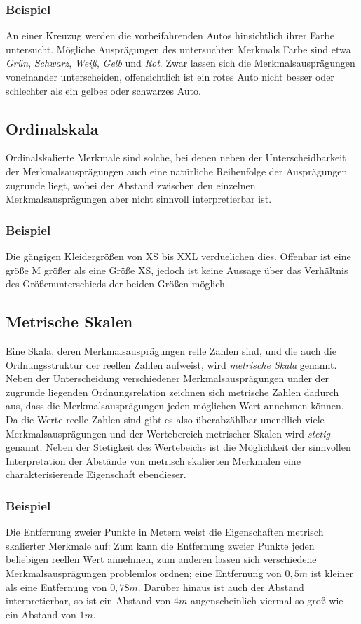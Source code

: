 \documentclass[fontsize=11pt]{scrartcl}
\begin{document}
                \subsubsection{Beispiel}
                    An einer Kreuzug werden die vorbeifahrenden Autos hinsichtlich ihrer Farbe untersucht. Mögliche Ausprägungen des untersuchten Merkmals Farbe sind etwa \emph{Grün}, \emph{Schwarz}, \emph{Weiß}, \emph{Gelb} und \emph{Rot}. Zwar lassen sich die Merkmalsausprägungen voneinander unterscheiden, offensichtlich ist ein rotes Auto nicht besser oder schlechter als ein gelbes oder schwarzes Auto.
                \subsection{Ordinalskala}
                    Ordinalskalierte Merkmale sind solche, bei denen neben der Unterscheidbarkeit der Merkmalsausprägungen auch eine natürliche Reihenfolge der Ausprägungen zugrunde liegt, wobei der Abstand zwischen den einzelnen Merkmalsausprägungen aber nicht sinnvoll interpretierbar ist. \cite{kohn2005}
                    \subsubsection{Beispiel}
                        Die gängigen Kleidergrößen von XS bis XXL verduelichen dies. Offenbar ist eine größe M größer als eine Größe XS, jedoch ist keine Aussage über das Verhältnis des Größenunterschieds der beiden Größen möglich.
                \subsection{Metrische Skalen}
                    Eine Skala, deren Merkmalsausprägungen relle Zahlen sind, und die auch die Ordnungsstruktur der reellen Zahlen aufweist, wird \emph{metrische Skala} genannt. Neben der Unterscheidung verschiedener Merkmalsausprägungen under der zugrunde liegenden Ordnungsrelation zeichnen sich metrische Zahlen dadurch aus, dass die Merkmalsausprägungen jeden möglichen Wert annehmen können. Da die Werte reelle Zahlen sind gibt es also überabzählbar unendlich viele Merkmalsausprägungen und der Wertebereich metrischer Skalen wird \emph{stetig} genannt. Neben der Stetigkeit des Wertebeichs ist die Möglichkeit der sinnvollen Interpretation der Abstände von metrisch skalierten Merkmalen eine charakterisierende Eigenschaft ebendieser.
                    \cite{kohn2005}
                    \subsubsection{Beispiel}
                        Die Entfernung zweier Punkte in Metern weist die Eigenschaften metrisch skalierter Merkmale auf: Zum kann die Entfernung zweier Punkte jeden beliebigen reellen Wert annehmen, zum anderen lassen sich verschiedene Merkmalsausprägungen problemlos ordnen; eine Entfernung von $ 0,5m $ ist kleiner als eine Entfernung von $ 0,78m $. Darüber hinaus ist auch der Abstand interpretierbar, so ist ein Abstand von $4m$ augenscheinlich viermal so groß wie ein Abstand von $1m$.
\end{document}
